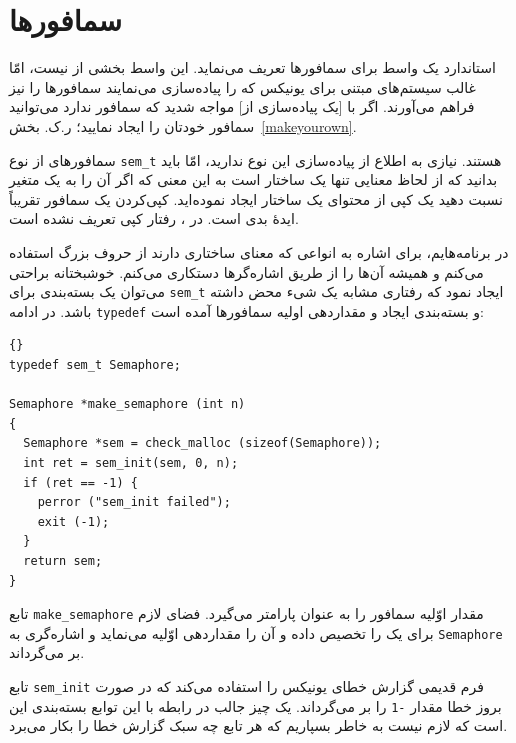 \documentclass{book}
\begin{document}
\section{سمافورها}

    استاندارد   یک واسط برای سمافورها تعریف می‌نماید. 
    این واسط بخشی از  نیست، امّا غالب سیستم‌های مبتنی برای یونیکس که  را پیاده‌سازی می‌نمایند سمافورها را نیز فراهم می‌آورند. 
    اگر با [یک پیاده‌سازی از]  مواجه شدید که سمافور ندارد می‌توانید سمافور خودتان را ایجاد نمایید؛ ر.ک. بخش~\ref{makeyourown}.
    
    سمافورهای   از نوع {\tt sem\_t} هستند. نیازی به اطلاع از پیاده‌سازی این نوع ندارید، امّا باید بدانید که از لحاظ معنایی 
    تنها یک ساختار است به این معنی که اگر آن را به یک متغیر نسبت دهید یک کپی از محتوای یک ساختار ایجاد نموده‌اید. 
    کپی‌کردن یک سمافور تقریباً ایدهٔ بدی است. در ، رفتار کپی تعریف نشده است. 


    در برنامه‌هایم، برای اشاره به انواعی که معنای ساختاری دارند از حروف بزرگ استفاده می‌کنم و همیشه آن‌ها را از طریق اشاره‌گرها دستکاری می‌کنم. 
    خوشبختانه براحتی می‌توان یک بسته‌بندی برای  {\tt sem\_t} ایجاد نمود که رفتاری مشابه یک شیء‌ محض داشته باشد. 
    در ادامه {\tt typedef}  و بسته‌بندی ایجاد و مقداردهی اولیه سمافورها آمده است: 

\begin{latin}
\begin{lstlisting}[title={}]{}
typedef sem_t Semaphore;

Semaphore *make_semaphore (int n)
{
  Semaphore *sem = check_malloc (sizeof(Semaphore));
  int ret = sem_init(sem, 0, n);
  if (ret == -1) {
    perror ("sem_init failed");
    exit (-1);    
  }
  return sem;
}
\end{lstlisting}
\end{latin}

    تابع {\tt make\_semaphore} مقدار اوّلیه سمافور را به عنوان پارامتر می‌گیرد. فضای لازم برای یک  را تخصیص داده و آن را 
    مقداردهی اوّلیه می‌نماید و اشاره‌گری به {\tt Semaphore} بر می‌گرداند. 

    تابع {\tt sem\_init} فرم قدیمی گزارش خطای یونیکس را استفاده می‌کند که در صورت بروز خطا مقدار {\tt -1} را بر می‌گرداند. یک چیز 
    جالب در رابطه با این توابع بسته‌بندی این است که لازم نیست به خاطر بسپاریم که هر تابع چه سبک گزارش خطا را بکار می‌برد. 
\end{document}
